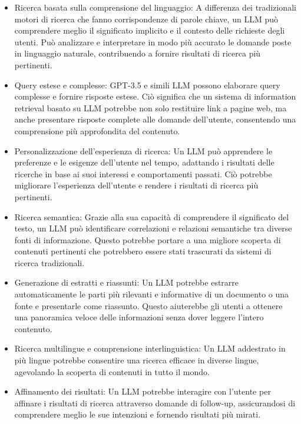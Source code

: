 \begin{itemize}
    \item Ricerca basata sulla comprensione del linguaggio: 
    A differenza dei tradizionali motori di ricerca che fanno corrispondenze di parole chiave,
     un LLM può comprendere meglio il significato implicito e il contesto delle richieste degli utenti.
      Può analizzare e interpretare in modo più accurato le domande poste in linguaggio naturale, 
      contribuendo a fornire risultati di ricerca più pertinenti.
    \item Query estese e complesse: GPT-3.5 e simili LLM possono elaborare query complesse e fornire risposte estese. Ciò significa che un sistema di information retrieval basato su LLM potrebbe non solo restituire link a pagine web, ma anche presentare risposte complete alle domande dell'utente, consentendo una comprensione più approfondita del contenuto.
    \item 
    Personalizzazione dell'esperienza di ricerca: Un LLM può apprendere le preferenze e le esigenze dell'utente nel tempo, adattando i risultati delle ricerche in base ai suoi interessi e comportamenti passati. Ciò potrebbe migliorare l'esperienza dell'utente e rendere i risultati di ricerca più pertinenti.
    \item Ricerca semantica: Grazie alla sua capacità di comprendere il significato del testo, un LLM può identificare correlazioni e relazioni semantiche tra diverse fonti di informazione. Questo potrebbe portare a una migliore scoperta di contenuti pertinenti che potrebbero essere stati trascurati da sistemi di ricerca tradizionali.
    \item 
    Generazione di estratti e riassunti: Un LLM potrebbe estrarre automaticamente le parti più rilevanti e informative di un documento o una fonte e presentarle come riassunto. Questo aiuterebbe gli utenti a ottenere una panoramica veloce delle informazioni senza dover leggere l'intero contenuto.

    \item Ricerca multilingue e comprensione interlinguistica: Un LLM addestrato in più lingue potrebbe consentire una ricerca efficace in diverse lingue, agevolando la scoperta di contenuti in tutto il mondo.

    \item 
    Affinamento dei risultati: Un LLM potrebbe interagire con l'utente per affinare i risultati di ricerca attraverso domande di follow-up, assicurandosi di comprendere meglio le sue intenzioni e fornendo risultati più mirati.
    
\end{itemize}